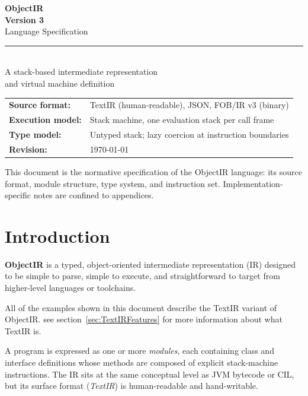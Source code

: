 \documentclass[11pt,a4paper]{article}
\begin{document}
\begin{titlepage}
  \centering
  \vspace*{3cm}
  {\Huge\bfseries ObjectIR}\\[0.5em]
  {\large\bfseries Version 3}\\[0.8em]
  {\Large Language Specification}\\[2.5em]
  \rule{0.55\linewidth}{0.4pt}\\[1.2em]
  {\normalsize
    A stack-based intermediate representation\\[0.3em]
    and virtual machine definition
  }\\[2.5em]
  \begin{tabular}{ll}
    \textbf{Source format:}   & TextIR (human-readable), JSON, FOB/IR v3 (binary) \\[0.2em]
    \textbf{Execution model:} & Stack machine, one evaluation stack per call frame \\[0.2em]
    \textbf{Type model:}      & Untyped stack; lazy coercion at instruction boundaries \\[0.2em]
    \textbf{Revision:}        & \today \\
  \end{tabular}
  \vfill
  {\small This document is the normative specification of the ObjectIR language:
  its source format, module structure, type system, and instruction set.
  Implementation-specific notes are confined to appendices.}
\end{titlepage}

\tableofcontents
\newpage

\section{Introduction}

\textbf{ObjectIR} is a typed, object-oriented intermediate representation (IR)
designed to be simple to parse, simple to execute, and straightforward to
target from higher-level languages or toolchains.

\begin{notebox}
	All of the examples shown in this document describe the TextIR variant of ObjectIR. see section~\ref{sec:TextIRFeatures} for more information about what TextIR is.
\end{notebox}


A program is expressed as one or more \emph{modules}, each containing class
and interface definitions whose methods are composed of explicit stack-machine
instructions. The IR sits at the same conceptual level as JVM bytecode or
CIL, but its surface format (\emph{TextIR}) is human-readable and
hand-writable.
\end{document}
